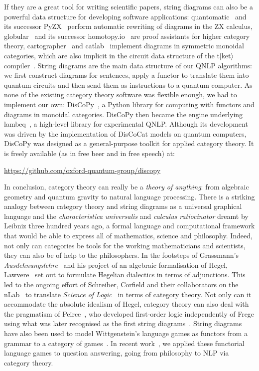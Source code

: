 If they are a great tool for writing scientific papers, string diagrams can also be a powerful data structure for developing software applications:
quantomatic~\cite{KissingerZamdzhiev15} and its successor PyZX~\cite{KissingerVanDeWetering19} perform automatic rewriting of diagrams in the ZX calculus,
globular~\cite{BarEtAl18} and its successor homotopy.io~\cite{ReutterVicary19} are proof assistants for higher category theory,
cartographer~\cite{SobocinskiEtAl19} and catlab~\cite{PattersonEtAl21} implement diagrams in symmetric monoidal categories, which are also implicit in the circuit data structure of the t$|$ket$\rangle$ compiler~\cite{SivarajahEtAl20}.
String diagrams are the main data structure of our QNLP algorithms: we first construct diagrams for sentences, apply a functor to translate them into quantum circuits and then send them as instructions to a quantum computer.
As none of the existing category theory software was flexible enough, we had to implement our own: DisCoPy~\cite{FeliceEtAl20}, a Python library for computing with functors and diagrams in monoidal categories.
DisCoPy then became the engine underlying lambeq~\cite{KartsaklisEtAl21}, a high-level library for experimental QNLP.
Although its development was driven by the implementation of DisCoCat models on quantum computers, DisCoPy was designed as a general-purpose toolkit for applied category theory.
It is freely available (as in free beer and in free speech) at:

\url{https://github.com/oxford-quantum-group/discopy}

In conclusion, category theory can really be a \emph{theory of anything}: from algebraic geometry and quantum gravity to natural language processing.
There is a striking analogy between category theory and string diagrams as a universal graphical language and the \emph{characteristica universalis} and \emph{calculus ratiocinator} dreamt by Leibniz three hundred years ago, a formal language and computational framework that would be able to express all of mathematics, science and philosophy.
Indeed, not only can categories be tools for the working mathematicians and scientists, they can also be of help to the philosophers.
In the footsteps of Grassmann's \emph{Ausdehnungslehre}~\cite{Grassmann44} and his project of an algebraic formalisation of Hegel, Lawvere~\cite{Lawvere89,Lawvere91,Lawvere92,Lawvere96} set out to formulate Hegelian dialectics in terms of adjunctions.
This led to the ongoing effort of Schreiber, Corfield and their collaborators on the nLab~\cite{SchreiberEtAl21} to translate \emph{Science of Logic}~\cite{Hegel12} in terms of category theory.
Not only can it accommodate the absolute idealism of Hegel, category theory can also deal with the pragmatism of Peirce~\cite{Peirce06},
who developed first-order logic independently of Frege using what was later recognised as the first string diagrams~\cite{BradyTrimble98,BradyTrimble00,MelliesZeilberger16,HaydonSobocinski20}.
String diagrams have also been used to model Wittgenstein's language games as functors from a grammar to a category of games~\cite{HedgesLewis18}.
In recent work~\cite{FeliceEtAl20a}, we applied these functorial language games to question answering, going from philosophy to NLP via category theory.
